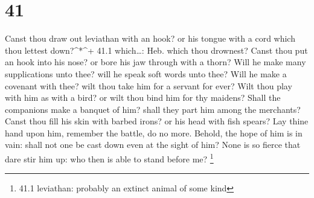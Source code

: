 \hypertarget{section-40}{%
\section{41}\label{section-40}}

 Canst thou draw out leviathan with an hook? or his tongue
with a cord which thou lettest down?\^{}*\^{}+ 41.1 which\ldots: Heb.
which thou drownest?  Canst thou put an hook into his nose?
or bore his jaw through with a thorn?  Will he make many
supplications unto thee? will he speak soft words unto thee?
 Will he make a covenant with thee? wilt thou take him for a
servant for ever?  Wilt thou play with him as with a bird?
or wilt thou bind him for thy maidens?  Shall the companions
make a banquet of him? shall they part him among the merchants?
 Canst thou fill his skin with barbed irons? or his head
with fish spears?  Lay thine hand upon him, remember the
battle, do no more.  Behold, the hope of him is in vain:
shall not one be cast down even at the sight of him?  None
is so fierce that dare stir him up: who then is able to stand before me?
\footnote{41.1 leviathan: probably an extinct animal of some kind}

